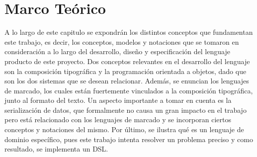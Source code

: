 \documentclass[12pt,letterpaper,titlepage,oneside,openright]{book}
\begin{document}

\chapter{Marco Teórico}

A lo largo de este capitulo se expondrán los distintos conceptos que fundamentan
este trabajo, es decir, los conceptos, modelos y notaciones que se tomaron en consideración a
lo largo del desarrollo, diseño y especificación del lenguaje producto de este
proyecto. Dos conceptos relevantes en el desarrollo del lenguaje son la composición
tipográfica y la programación orientada a objetos, dado que son los dos sistemas que
se desean relacionar. Además, se enuncian los lenguajes de marcado, los cuales están
fuertemente vinculados a la composición tipográfica, junto al formato del texto. Un
aspecto importante a tomar en cuenta es la serialización de datos, que formalmente no causa un
gran impacto en el trabajo pero está relacionado con los lenguajes de marcado y se
incorporan ciertos conceptos y notaciones del mismo. Por último, se ilustra qué es
un lenguaje de dominio específico, pues este trabajo intenta resolver un problema
preciso y como resultado, se implementa un DSL.
\end{document}
